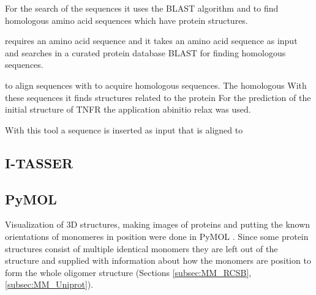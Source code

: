 For the search of the sequences it uses the BLAST algorithm and to find homologous amino acid sequences which have protein structures.

requires an amino acid sequence and  it takes an amino acid sequence as input and searches in a curated protein database BLAST for finding homologous sequences. 


to align sequences with to acquire homologous sequences.  The homologous With these sequences it finds structures related to the protein
For the prediction of the initial structure of TNFR the application abinitio relax was used. 

With this tool a sequence is inserted as input that is aligned to 
 


\subsection{I-TASSER}
\label{subsec:MM_I_TASSER}

\subsection{PyMOL}
Visualization of 3D structures, making images of proteins and putting the known orientations of monomeres in position  were done in PyMOL \cite{}.
Since some protein structures consist of multiple identical monomers they are left out of the structure and supplied with information about how the monomers are position to form the whole oligomer structure (Sections \ref{subsec:MM_RCSB}, \ref{subsec:MM_Uniprot}).
\label{subsec:MM_PyMOL}

